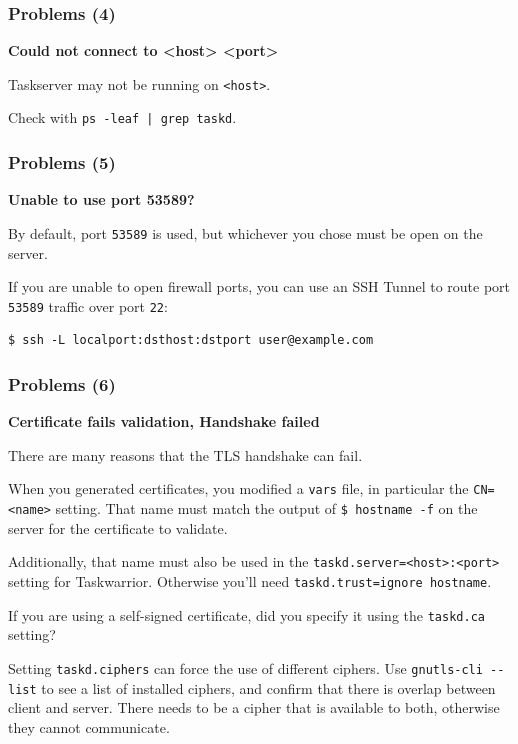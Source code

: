 \documentclass[t,handout]{beamer}
\begin{document}
\begin{frame}[fragile]\frametitle{Problems (4)}
    \vfill
    \textbf{Could not connect to <host> <port>}

    Taskserver may not be running on \verb+<host>+.

    Check with \verb+ps -leaf | grep taskd+.
\end{frame}

\begin{frame}[fragile]\frametitle{Problems (5)}
    \vfill
    \textbf{Unable to use port 53589?}

    By default, port \verb+53589+ is used, but whichever you chose must be open on the server.

    If you are unable to open firewall ports, you can use an SSH Tunnel to route port \verb+53589+ traffic over port \verb+22+:

    \begin{lstlisting}
$ ssh -L localport:dsthost:dstport user@example.com\end{lstlisting}
\end{frame}

\begin{frame}[fragile]\frametitle{Problems (6)}
    \vfill
    \textbf{Certificate fails validation, Handshake failed}

    There are many reasons that the TLS handshake can fail.

    When you generated certificates, you modified a \verb+vars+ file, in particular the \verb+CN=<name>+ setting. That name must match the output of  \verb+$ hostname -f+ on the server for the certificate to validate.

    Additionally, that name must also be used in the \verb+taskd.server=<host>:<port>+ setting for Taskwarrior. Otherwise you'll need \verb+taskd.trust=ignore hostname+.

    If you are using a self-signed certificate, did you specify it using the \verb+taskd.ca+ setting?

    Setting \verb+taskd.ciphers+ can force the use of different ciphers. Use \verb+gnutls-cli --list+ to see a list of installed ciphers, and confirm that there is overlap between client and server. There needs to be a cipher that is available to both, otherwise they cannot communicate.
\end{frame}
\end{document}

